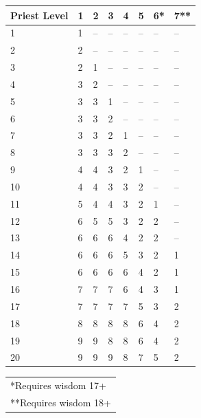 \noindent
\begin{minipage}{\columnwidth}

\label{priestspells}
\noindent
\begin{tabular}{|m{}|m{}|m{}|m{}|m{}|m{}|m{}|m{}|}
\hline
Priest Level	& 1	& 2	& 3	& 4	& 5	& 6*	& 7**\\
\hline\hline
\rowcolor[gray]{.9}1		& 1		& --	& --	& --	& --	& --	& -- \\
2		& 2		& --	& --	& --	& --	& --	& -- \\
\rowcolor[gray]{.9}3		& 2		& 1		& --	& --	& --	& --	& -- \\
4		& 3		& 2		& --	& --	& --	& --	& -- \\
\rowcolor[gray]{.9}5		& 3		& 3		& 1		& --	& --	& --	& -- \\
6		& 3		& 3		& 2		& --	& --	& --	& -- \\
\rowcolor[gray]{.9}7		& 3		& 3		& 2		& 1		& --	& --	& -- \\
8		& 3		& 3		& 3		& 2		& --	& --	& -- \\
\rowcolor[gray]{.9}9		& 4		& 4		& 3		& 2		& 1		& --	& -- \\
10		& 4		& 4		& 3		& 3		& 2		& --	& -- \\
\rowcolor[gray]{.9}11		& 5		& 4		& 4		& 3		& 2		& 1		& -- \\
12		& 6		& 5		& 5		& 3		& 2		& 2		& -- \\
\rowcolor[gray]{.9}13		& 6		& 6		& 6		& 4		& 2		& 2		& -- \\
14		& 6		& 6		& 6		& 5		& 3		& 2		& 1 \\
\rowcolor[gray]{.9}15		& 6		& 6		& 6		& 6		& 4		& 2		& 1 \\
16		& 7		& 7		& 7		& 6		& 4		& 3		& 1 \\
\rowcolor[gray]{.9}17		& 7		& 7		& 7		& 7		& 5		& 3		& 2 \\
18		& 8		& 8		& 8		& 8		& 6		& 4		& 2 \\
\rowcolor[gray]{.9}19		& 9		& 9		& 8		& 8		& 6		& 4		& 2 \\
20		& 9		& 9		& 9		& 8		& 7		& 5		& 2 \\
\hline
\end{tabular}
\noindent
\begin{tabular}{p{\textwidth}}
*Requires wisdom 17+ \\
**Requires wisdom 18+ \\
\end{tabular}\vspace{.5em}

\end{minipage}

